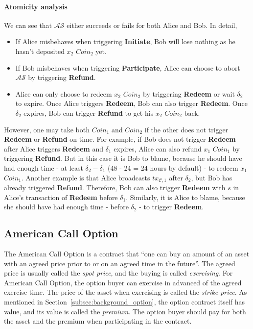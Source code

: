 \paragraph{Atomicity analysis}
We can see that $\mathcal{AS}$ either succeeds or fails for both Alice and Bob.
In detail,

\begin{itemize}
    \item If Alice misbehaves when triggering \textbf{Initiate}, Bob will lose nothing as he hasn't deposited $x_2$ $Coin_2$ yet.
    \item If Bob misbehaves when triggering \textbf{Participate}, Alice can choose to abort $\mathcal{AS}$ by triggering \textbf{Refund}.
    \item Alice can only choose to redeem $x_2$ $Coin_2$ by triggering \textbf{Redeem} or wait $\delta_2$ to expire.
    Once Alice triggers \textbf{Redeem}, Bob can also trigger \textbf{Redeem}.
    Once $\delta_2$ expires, Bob can trigger \textbf{Refund} to get his $x_2$ $Coin_2$ back.
\end{itemize}

However, one may take both $Coin_1$ and $Coin_2$ if the other does not trigger \textbf{Redeem} or \textbf{Refund} on time.
For example, if Bob does not trigger \textbf{Redeem} after Alice triggers \textbf{Redeem} and $\delta_1$ expires, Alice can also refund $x_1$ $Coin_1$ by triggering \textbf{Refund}.
But in this case it is Bob to blame, because he should have had enough time - at least $\delta_2 - \delta_1$ (48 - 24 = 24 hours by default) - to redeem $x_1$ $Coin_1$.
Another example is that Alice broadcasts $tx_{\mathcal{C}, 1}$ after $\delta_2$, but Bob has already triggered \textbf{Refund}.
Therefore, Bob can also trigger \textbf{Redeem} with $s$ in Alice's transaction of \textbf{Redeem} before $\delta_1$.
Similarly, it is Alice to blame, because she should have had enough time - before $\delta_2$ - to trigger \textbf{Redeem}.















\subsection{American Call Option}

The American Call Option is a contract that ``one can buy an amount of an asset with an agreed price prior to or on an agreed time in the future''. 
The agreed price is usually called the \textit{spot price}, and the buying is called \textit{exercising}.
For American Call Option, the option buyer can exercise in advanced of the agreed exercise time.
The price of the asset when exercising is called the \textit{strike price}.
As mentioned in Section~\ref{subsec:background_option}, the option contract itself has value, and its value is called the \textit{premium}.
The option buyer should pay for both the asset and the premium when participating in the contract.

